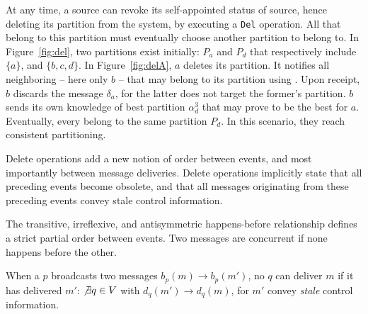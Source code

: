 At any time, a source can revoke its self-appointed status of source,
hence deleting its partition from the system, by executing a
\texttt{Del} operation. All \processes that belong to this partition
must eventually choose another partition to belong to. In
Figure~\ref{fig:del}, two partitions exist initially: $P_a$ and $P_d$
that respectively include $\{a\}$, and $\{b, c, d\}$. In
Figure~\ref{fig:delA}, \Process $a$ deletes its partition. It notifies
all neighboring \processes -- here only \Process $b$ -- that may
belong to its partition using \NAMEB. Upon receipt, \Process $b$
discards the message $\delta_a$, for the latter does not target the
former's partition. \Process $b$ sends its own knowledge of best
partition $\alpha_d^3$ that may prove to be the best for \Process
$a$. Eventually, every \processes belong to the same partition
$P_d$. In this scenario, they reach consistent partitioning.

Delete operations add a new notion of order between events, and most
importantly between message deliveries. Delete operations implicitly
state that all preceding events become obsolete, and that all messages
originating from these preceding events convey stale control
information.

\begin{definition}
  The transitive, irreflexive, and antisymmetric happens-before
  relationship defines a strict partial order between events. Two
  messages are concurrent if none happens before the other.
\end{definition}

\begin{definition}
  When a \process $p$ broadcasts two messages $b_p(m) \rightarrow
  b_p(m')$, no \process $q$ can deliver $m$ if it has delivered $m'$:
  $\not\exists q \in V$ with $d_q(m') \rightarrow d_q(m)$, for $m'$
  convey \emph{stale} control information.
\end{definition}



